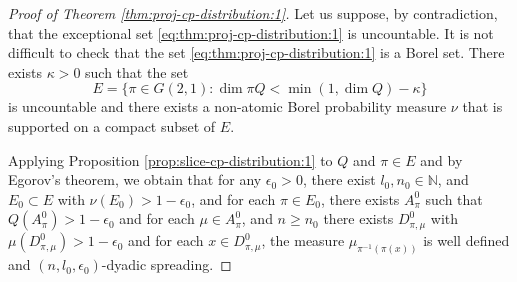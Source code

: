 \documentclass[a4paper,11pt]{amsart}
\theoremstyle{definition}
\numberwithin{equation}{section}
\def\D{\mathcal{D}}
\def\N{\mathbb N}
\begin{document}
\begin{proof}[Proof of Theorem \ref{thm:proj-cp-distribution:1}]
Let us suppose,  by contradiction, that the exceptional set \eqref{eq:thm:proj-cp-distribution:1}  is uncountable.  It is not difficult to check that the set \eqref{eq:thm:proj-cp-distribution:1} is a Borel set.  There exists $\kappa>0$ such that the set 
\[
E=\{ \pi\in G(2,1): \dim \pi Q<\min(1,\dim Q)-\kappa \}
\]
is uncountable and there exists a non-atomic Borel probability measure $\nu$ that is supported on a compact subset of $E$.

Applying Proposition \ref{prop:slice-cp-distribution:1} to $Q$ and $\pi\in E$ and by Egorov's theorem,  we obtain that for any $\epsilon_0>0$, there exist $l_0,  n_0\in \N$,  and $E_0\subset E$ with $\nu(E_0)>1-\epsilon_0$, and for each $\pi\in E_0$, there exists $A_\pi^0$ such that $Q(A_\pi^0)>1-\epsilon_0$ and for each $\mu\in A_\pi^0$, and $n\ge n_0$  there exists $D_{\pi,\mu}^0$ with $\mu(D_{\pi,\mu}^0)>1-\epsilon_0$ and for each $x\in D_{\pi,\mu}^0$, the measure $\mu_{\pi^{-1}(\pi(x))}$ is well defined  and $(n,l_0,\epsilon_0)$-dyadic spreading.

\end{proof}
\end{document}
